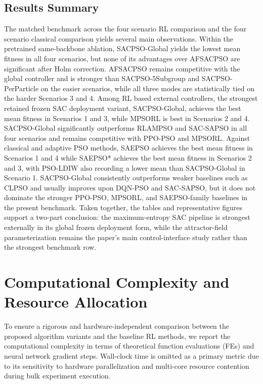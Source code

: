 \documentclass[final,5p,times]{elsarticle}
\begin{document}
\subsection{Results Summary}
The matched benchmark across the four scenario RL comparison and the four scenario classical comparison yields several main observations.
Within the pretrained same-backbone ablation, SACPSO-Global yields the lowest mean fitness in all four scenarios, but none of its advantages over AFSACPSO are significant after Holm correction.
AFSACPSO remains competitive with the global controller and is stronger than SACPSO-5Subgroup and SACPSO-PerParticle on the easier scenarios, while all three modes are statistically tied on the harder Scenarios 3 and 4.
Among RL based external controllers, the strongest retained frozen SAC deployment variant, SACPSO-Global, achieves the best mean fitness in Scenarios 1 and 3, while MPSORL is best in Scenarios 2 and 4.
SACPSO-Global significantly outperforms RLAMPSO and SAC-SAPSO in all four scenarios and remains competitive with PPO-PSO and MPSORL.
Against classical and adaptive PSO methods, SAEPSO achieves the best mean fitness in Scenarios 1 and 4 while SAEPSO* achieves the best mean fitness in Scenarios 2 and 3, with PSO-LDIW also recording a lower mean than SACPSO-Global in Scenario 1.
SACPSO-Global consistently outperforms weaker baselines such as CLPSO and usually improves upon DQN-PSO and SAC-SAPSO, but it does not dominate the stronger PPO-PSO, MPSORL, and SAEPSO-family baselines in the present benchmark.
Taken together, the tables and representative figures support a two-part conclusion: the maximum-entropy SAC pipeline is strongest externally in its global frozen deployment form, while the attractor-field parameterization remains the paper's main control-interface study rather than the strongest benchmark row.


\section{Computational Complexity and Resource Allocation}
\label{sec:complexity}
To ensure a rigorous and hardware-independent comparison between the proposed algorithm variants and the baseline RL methods, we report the computational complexity in terms of theoretical function evaluations (FEs) and neural network gradient steps. Wall-clock time is omitted as a primary metric due to its sensitivity to hardware parallelization and multi-core resource contention during bulk experiment execution.
\end{document}
